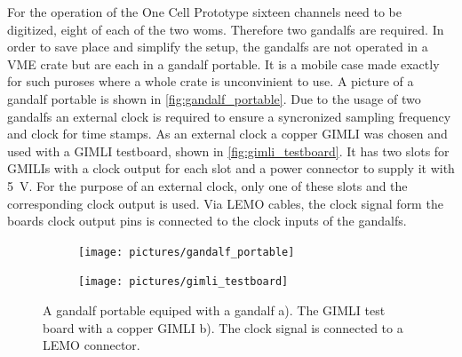 For the operation of the One Cell Prototype sixteen channels need to be digitized, eight of each of the two \acp{wom}.
Therefore two \acp{gandalf} are required.
In order to save place and simplify the setup, the \acp{gandalf} are not operated in a VME crate but are each in a \ac{gandalf} portable.
It is a mobile case made exactly for such puroses where a whole crate is unconvinient to use.
A picture of a \ac{gandalf} portable is shown in \autoref{fig:gandalf_portable}.
Due to the usage of two \acp{gandalf} an external clock is required to ensure a syncronized sampling frequency and clock for time stamps.
As an external clock a copper GIMLI was chosen and used with a GIMLI testboard, shown in \autoref{fig:gimli_testboard}.
It has two slots for GMILIs with a clock output for each slot and a power connector to supply it with \SI{5}{\volt}.
For the purpose of an external clock, only one of these slots and the corresponding clock output is used.
Via LEMO cables, the clock signal form the boards clock output pins is connected to the clock inputs of the \acp{gandalf}.
\begin{figure}
	\centering
	\begin{subfigure}[b]{.4\textwidth}
		\centering
		\texttt{[image: pictures/gandalf\_portable]} 
		\caption[A \ac{gandalf} portable equiped with a \ac{gandalf}.]{}
		\label{fig:gandalf_portable}
	\end{subfigure}
	\begin{subfigure}[b]{.55\textwidth}
		\centering
		\texttt{[image: pictures/gimli\_testboard]}
		\caption[]{}
		\label{fig:gimli_testboard}
	\end{subfigure}
	\caption[GANDALF portable and GIMLI testboard]{A \ac{gandalf} portable equiped with a \ac{gandalf} a). The GIMLI test board with a copper GIMLI b). The clock signal is connected to a LEMO connector.}
	\label{}
\end{figure}
